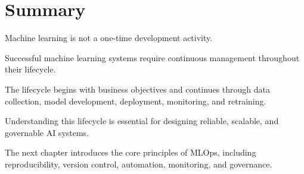 \section{Summary}

Machine learning is not a one-time development activity.

Successful machine learning systems require continuous management throughout their lifecycle.

The lifecycle begins with business objectives and continues through data collection, model development, deployment, monitoring, and retraining.

Understanding this lifecycle is essential for designing reliable, scalable, and governable AI systems.

The next chapter introduces the core principles of MLOps, including reproducibility, version control, automation, monitoring, and governance.